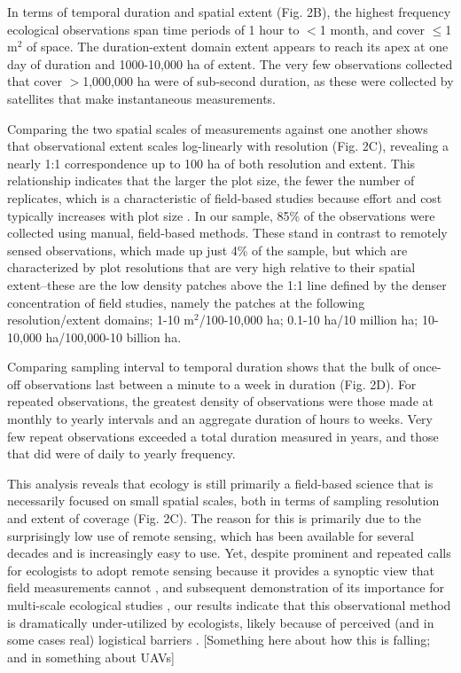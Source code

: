 \documentclass[12pt]{article}
\begin{document}
In terms of temporal duration and spatial extent (Fig. 2B), the highest frequency ecological observations span time periods of 1 hour to $<$1 month, and cover $\leq$1 m$^2$ of space. The duration-extent domain extent appears to reach its apex at one day of duration and 1000-10,000 ha of extent. The very few observations collected that cover $>$1,000,000 ha were of sub-second duration, as these were collected by satellites that make instantaneous measurements.  

Comparing the two spatial scales of measurements against one another shows that observational extent scales log-linearly with resolution (Fig. 2C), revealing a nearly 1:1 correspondence up to 100 ha of both resolution and extent. This relationship indicates that the larger the plot size, the fewer the number of replicates, which is a characteristic of field-based studies because effort and cost typically increases with plot size \cite{kareiva_spatial_1988}. In our sample, 85\% of the observations were collected using manual, field-based methods. These stand in contrast to remotely sensed observations, which made up just 4\% of the sample, but which are characterized by plot resolutions that are very high relative to their spatial extent--these are the low density patches above the 1:1 line defined by the denser concentration of field studies, namely the patches at the following resolution/extent domains; 1-10 m$^2$/100-10,000 ha; 0.1-10 ha/10 million ha; 10-10,000 ha/100,000-10 billion ha.  

Comparing sampling interval to temporal duration shows that the bulk of once-off observations last between a minute to a week in duration (Fig. 2D). For repeated observations, the greatest density of observations were those made at monthly to yearly intervals and an aggregate duration of hours to weeks.  Very few repeat observations exceeded a total duration measured in years, and those that did were of daily to yearly frequency.  

This analysis reveals that ecology is still primarily a field-based science that is necessarily focused on small spatial scales, both in terms of sampling resolution and extent of coverage (Fig. 2C). The reason for this is primarily due to the surprisingly low use of remote sensing, which has been available for several decades and is increasingly easy to use. Yet, despite prominent and repeated calls for ecologists to adopt remote sensing because it provides a synoptic view that field measurements cannot \cite{turner_remote_2003,kerr_space_2003,pettorelli_satellite_2014}, and subsequent demonstration of its importance for multi-scale ecological studies \cite{estes_habitat_2008,estes_predictive_2011}, our results indicate that this observational method is dramatically under-utilized by ecologists, likely because of perceived (and in some cases real) logistical barriers \cite{pettorelli_satellite_2014}. [Something here about how this is falling; and in something about UAVs]
\end{document}
